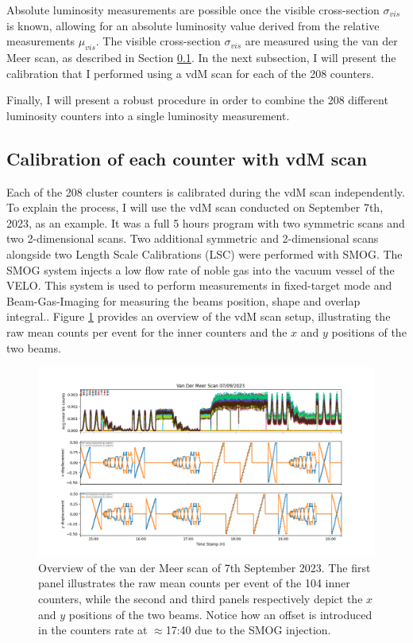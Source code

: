 Absolute luminosity measurements are possible once the visible cross-section $\sigma_{vis}$ is known, allowing for an absolute luminosity value derived from the relative measurements $\mu_{vis}$. The visible cross-section $\sigma_{vis}$ are measured using the van der Meer scan, as described in Section \ref{sec:calibration_vdm}. In the next subsection, I will present the calibration that I performed using a vdM scan for each of the 208 counters.

Finally, I will present a robust procedure in order to combine the 208 different luminosity counters into a single luminosity measurement.

\subsection{Calibration of each counter with vdM scan}\label{sec:calibration_vdm}
Each of the 208 cluster counters is calibrated during the vdM scan independently. To explain the process, I will use the vdM scan conducted on September 7th, 2023, as an example.
It was a full 5 hours program with two symmetric scans and two 2-dimensional scans. Two additional symmetric and 2-dimensional scans alongside two Length Scale Calibrations (LSC) were performed with SMOG. The SMOG system\cite{CERN-LHCC-2019-005} injects a low flow rate of noble gas into the vacuum vessel of the VELO. This system is used to perform measurements in fixed-target mode and Beam-Gas-Imaging for measuring the beams position, shape and overlap integral\cite{Coombs:2767576}.. Figure \ref{fig:inner_vdm_sep} provides an overview of the vdM scan setup, illustrating the raw mean counts per event for the inner counters and the $x$ and $y$ positions of the two beams.

\begin{figure}
    \centering
    \includegraphics[width=\textwidth]{figures/inner_counts_bkg.png}
    \caption{Overview of the van der Meer scan of 7th September 2023. The first panel illustrates the raw mean counts per event of the 104 inner counters, while the second and third panels respectively depict the $x$ and $y$ positions of the two beams. Notice how an offset is introduced in the counters rate at $\approx$17:40 due to the SMOG injection.}
    \label{fig:inner_vdm_sep}
\end{figure}


